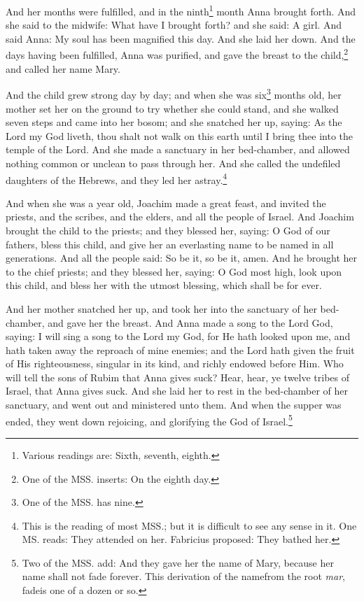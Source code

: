 \pend\pstart
And her months were fulfilled, and in the ninth\footnote{Various readings are: Sixth, seventh, eighth.} month Anna brought forth. And she said to the midwife: What have I brought forth? and she said: A girl. And said Anna: My soul has been magnified this day. And she laid her down. And the days having been fulfilled, Anna was purified, and gave the breast to the child,\footnote{One of the MSS. inserts: On the eighth day.} and called her name Mary.

\pend\pstart
{}

\pend\setcounter{pstartR}{1}\pstart
And the child grew strong day by day; and when she was six\footnote{One of the MSS. has nine.} months old, her mother set her on the ground to try whether she could stand, and she walked seven steps and came into her bosom; and she snatched her up, saying: As the Lord my God liveth, thou shalt not walk on this earth until I bring thee into the temple of the Lord. And she made a sanctuary in her bed-chamber, and allowed nothing common or unclean to pass through her. And she called the undefiled daughters of the Hebrews, and they led her astray.\footnote{This is the reading of most MSS.; but it is difficult to see any sense in it. One MS. reads: They attended on her. Fabricius proposed: They bathed her.}

\pend\pstart
And when she was a year old, Joachim made a great feast, and invited the priests, and the scribes, and the elders, and all the people of Israel. And Joachim brought the child to the priests; and they blessed her, saying: O God of our fathers, bless this child, and give her an everlasting name to be named in all generations. And all the people said: So be it, so be it, amen. And he brought her to the chief priests; and they blessed her, saying: O God most high, look upon this child, and bless her with the utmost blessing, which shall be for ever.

\pend\pstart
And her mother snatched her up, and took her into the sanctuary of her bed-chamber, and gave her the breast. And Anna made a song to the Lord God, saying: I will sing a song to the Lord my God, for He hath looked upon me, and hath taken away the reproach of mine enemies; and the Lord hath given the fruit of His righteousness, singular in its kind, and richly endowed before Him. Who will tell the sons of Rubim that Anna gives suck? Hear, hear, ye twelve tribes of Israel, that Anna gives suck. And she laid her to rest in the bed-chamber of her sanctuary, and went out and ministered unto them. And when the supper was ended, they went down rejoicing, and glorifying the God of Israel.\footnote{Two of the MSS. add: And they gave her the name of Mary, because her name shall not fade forever. This derivation of the name\textemdash from the root \textit{mar}, fade\textemdash is one of a dozen or so.}

